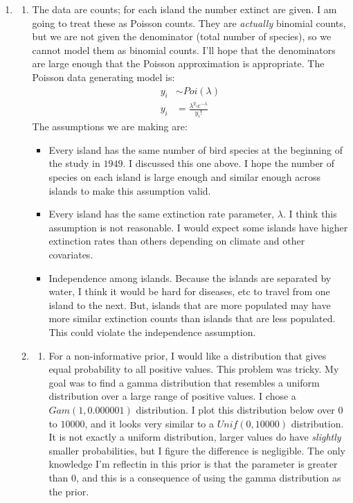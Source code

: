 \documentclass[11pt]{article}\usepackage[]{graphicx}\usepackage[]{color}
\begin{document}
\begin{doublespacing}
\begin{enumerate}
\item \begin{enumerate}
\item The data are counts; for each island the number extinct are given. I am going to treat these as Poisson counts. They are {\it actually} binomial counts, but we are not given the denominator (total number of species), so we cannot model them as binomial counts. I'll hope that the denominators are large enough that the Poisson approximation is appropriate. The Poisson data generating model is:
\begin{align*}
y_i &\sim Poi(\lambda) \\
y_i &= \frac{\lambda^{y_i}e^{-\lambda}}{y_i!}
\end{align*}
The assumptions we are making are:
\begin{itemize}
\item Every island has the same number of bird species at the beginning of the study in $1949$. I discussed this one above. I hope the number of species on each island is large enough and similar enough across islands to make this assumption valid.
\item Every island has the same extinction rate parameter, $\lambda$. I think this assumption is not reasonable. I would expect some islands have higher extinction rates than others depending on climate and other covariates.
\item Independence among islands. Because the islands are separated by water, I think it would be hard for diseases, etc to travel from one island to the next. But, islands that are more populated may have more similar extinction counts than islands that are less populated. This could violate the independence assumption.
\end{itemize}

\item \begin{enumerate}
\item For a non-informative prior, I would like a distribution that gives equal probability to all positive values. This problem was tricky. My goal was to find a gamma distribution that resembles a uniform distribution over a large range of positive values. I chose a $Gam(1, 0.000001)$ distribution. I plot this distribution below over $0$ to $10000$, and it looks very similar to a $Unif(0, 10000)$ distribution. It is not exactly a uniform distribution, larger values do have {\it slightly} smaller probabilities, but I figure the difference is negligible. The only knowledge I'm reflectin in this prior is that the parameter is greater than $0$, and this is a consequence of using the gamma distribution as the prior. \\


\end{enumerate}
\end{enumerate}
\end{enumerate}
\end{doublespacing}
\end{document}
